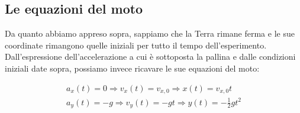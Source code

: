 \documentclass{article}
\begin{document}
\subsection{Le equazioni del moto}
Da quanto abbiamo appreso sopra, sappiamo che la Terra rimane ferma
e le sue coordinate rimangono quelle iniziali per tutto il tempo
dell'esperimento.
Dall'espressione dell'accelerazione a cui è sottoposta la pallina
e dalle condizioni iniziali date sopra, possiamo invece ricavare le
sue equazioni del moto:


\begin{align}
a_x(t) = 0 \Rightarrow v_x(t) = v_{x,0} \Rightarrow x(t) = v_{x,0}t \\
a_y(t) = -g \Rightarrow v_y(t) = - g t \Rightarrow y(t) = - \frac{1}{2} g t^2 
\end{align}

{}

\end{document}
